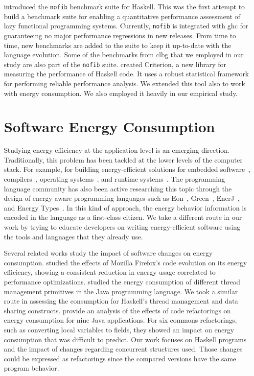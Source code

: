  introduced the \texttt{nofib} benchmark suite for Haskell. This was the first attempt to build a benchmark suite for enabling a quantitative performance assessment of lazy functional programming systems. Currently, \texttt{nofib} is integrated with \ac{ghc} for guaranteeing no major performance regressions in new releases. From time to time, new benchmarks are added to the suite to keep it up-to-date with the language evolution. Some of the benchmarks from \acl{clbg} that we employed in our study are also part of the \texttt{nofib} suite.  created Criterion, a new library for measuring the performance of Haskell code. It uses a robust statistical framework for performing reliable performance analysis. We extended this tool also to work with energy consumption. We also employed it heavily in our empirical study.


\section{Software Energy Consumption}
Studying energy efficiency at the application level is an emerging direction. Traditionally, this problem has been tackled at the lower levels of the computer stack. For example, for building energy-efficient solutions for embedded software~\cite{tiwari:1994}, compilers~\cite{hsu:2003}, operating systems~\cite{merkel:2006}, and runtime systems~\cite{ribic:2014, farkas:2000}. The programming language community has also been active researching this topic through the design of energy-aware programming languages such as Eon~\cite{sorber:2007}, Green~\cite{baek:2010}, EnerJ~\cite{sampson:2011}, and Energy Types~\cite{cohen:2012}. In this kind of approach, the energy behavior information is encoded in the language as a first-class citizen. We take a different route in our work by trying to educate developers on writing energy-efficient software using the tools and languages that they already use.

Several related works study the impact of software changes on energy consumption.  studied the effects of Mozilla Firefox's code evolution on its energy efficiency, showing a consistent reduction in energy usage correlated to performance optimizations.  studied the energy consumption of different thread management primitives in the Java programming language. We took a similar route in assessing the consumption for Haskell's thread management and data sharing constructs.  provide an analysis of the effects of code refactorings on energy consumption for nine Java applications. For six commons refactorings, such as converting local variables to fields, they showed an impact on energy consumption that was difficult to predict. Our work focuses on Haskell programs and the impact of changes regarding concurrent structures used. Those changes could be expressed as refactorings since the compared versions have the same program behavior.


